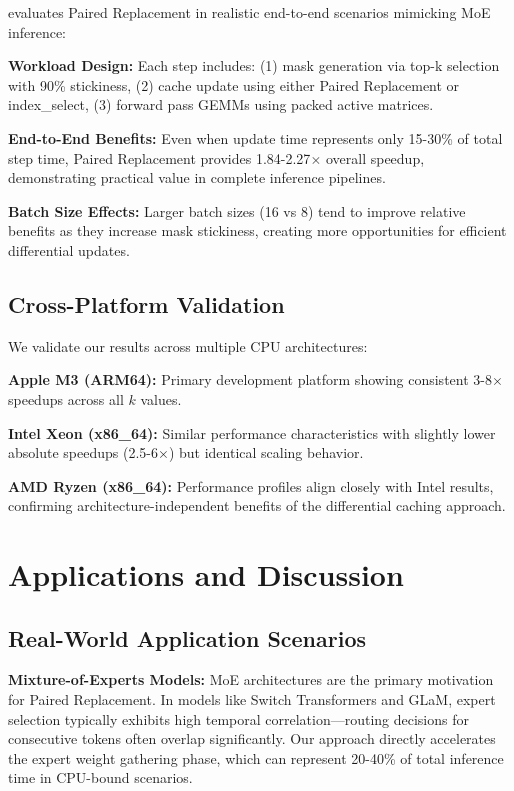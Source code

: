 \documentclass{article}
\numberwithin{equation}{section}
\theoremstyle{plain}
\theoremstyle{definition}
\theoremstyle{remark}
\begin{document}
 evaluates Paired Replacement in realistic end-to-end scenarios mimicking MoE inference:

\textbf{Workload Design:} Each step includes: (1) mask generation via top-k selection with 90\% stickiness, (2) cache update using either Paired Replacement or index\_select, (3) forward pass GEMMs using packed active matrices.

\textbf{End-to-End Benefits:} Even when update time represents only 15-30\% of total step time, Paired Replacement provides 1.84-2.27$\times$ overall speedup, demonstrating practical value in complete inference pipelines.

\textbf{Batch Size Effects:} Larger batch sizes (16 vs 8) tend to improve relative benefits as they increase mask stickiness, creating more opportunities for efficient differential updates.

\subsection{Cross-Platform Validation}

We validate our results across multiple CPU architectures:

\textbf{Apple M3 (ARM64):} Primary development platform showing consistent 3-8$\times$ speedups across all $k$ values.

\textbf{Intel Xeon (x86\_64):} Similar performance characteristics with slightly lower absolute speedups (2.5-6$\times$) but identical scaling behavior.

\textbf{AMD Ryzen (x86\_64):} Performance profiles align closely with Intel results, confirming architecture-independent benefits of the differential caching approach.

\section{Applications and Discussion} \label{sec:applications}

\subsection{Real-World Application Scenarios}

\textbf{Mixture-of-Experts Models:} MoE architectures are the primary motivation for Paired Replacement. In models like Switch Transformers and GLaM, expert selection typically exhibits high temporal correlation—routing decisions for consecutive tokens often overlap significantly. Our approach directly accelerates the expert weight gathering phase, which can represent 20-40\% of total inference time in CPU-bound scenarios.
\end{document}
